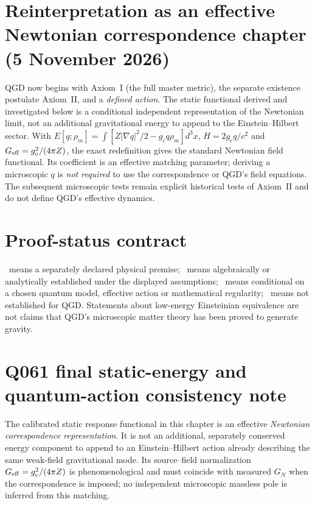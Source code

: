 \documentclass[11pt,a4paper]{article}
\theoremstyle{remark}\newtheorem{remark}[theorem]{Remark}
\begin{document}
\section*{Reinterpretation as an effective Newtonian correspondence chapter (5 November 2026)}
\noindent QGD now begins with Axiom~I (the full master metric), the separate existence postulate Axiom~II, and a \emph{defined action}. The static functional derived and investigated below is a conditional independent representation of the Newtonian limit, not an additional gravitational energy to append to the Einstein--Hilbert sector. With $E[q;\rho_m]=\int[Z|\nabla q|^2/2-g_cq\rho_m]d^3x$, $H=2g_cq/c^2$ and $G_{\rm eff}=g_c^2/(4\pi Z)$, the exact redefinition gives the standard Newtonian field functional. Its coefficient is an effective matching parameter; deriving a microscopic $q$ is \emph{not required} to use the correspondence or QGD's field equations. The subsequent microscopic tests remain explicit historical tests of Axiom~II and do not define QGD's effective dynamics.

\section*{Proof-status contract}
\AX\ means a separately declared physical premise; \D\ means algebraically or analytically established under the displayed assumptions; \C\ means conditional on a chosen quantum model, effective action or mathematical regularity; \OPEN\ means not established for QGD. Statements about low-energy Einsteinian equivalence are not claims that QGD's microscopic matter theory has been proved to generate gravity.
\clearpage\tableofcontents\newpage


\section{Q061 final static-energy and quantum-action consistency note}
The calibrated static response functional in this chapter is an effective \emph{Newtonian correspondence representation}. It is not an additional, separately conserved energy component to append to an Einstein--Hilbert action already describing the same weak-field gravitational mode. Its source--field normalization $G_{\rm eff}=g_c^2/(4\pi Z)$ is phenomenological and must coincide with measured $G_N$ when the correspondence is imposed; no independent microscopic massless pole is inferred from this matching.
\end{document}
